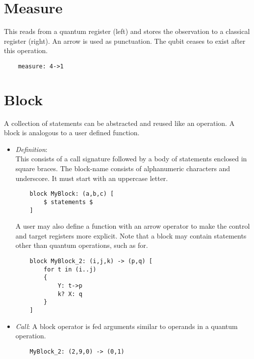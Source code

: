 \section{Measure}
This reads from a quantum register (left) and stores the observation to a classical register (right). An arrow is used as punctuation. The qubit ceases to exist after this operation.
\begin{lstlisting}
    measure: 4->1
\end{lstlisting}


\section{Block}
A collection of statements can be abstracted and reused like an operation. A block is analogous to a user defined function. 

\begin{itemize}
    \item \emph{Definition}: \\
    This consists of a call signature followed by a body of statements enclosed in square braces. The block-name consists of alphanumeric characters and underscore. It must start with an uppercase letter.

    \begin{lstlisting}
    block MyBlock: (a,b,c) [
        $ statements $
    ]
    \end{lstlisting}
    A user may also define a function with an arrow operator to make the control and target registers more explicit. 
    Note that a block may contain statements other than quantum operations, such as for.
    \begin{lstlisting}
    block MyBlock_2: (i,j,k) -> (p,q) [
        for t in (i..j)
        {
            Y: t->p
            k? X: q
        }
    ]
    \end{lstlisting}

  \item \emph{Call}:
    A block operator is fed arguments similar to operands in a quantum operation.
    \begin{lstlisting}
    MyBlock_2: (2,9,0) -> (0,1)
    \end{lstlisting}
\end{itemize}